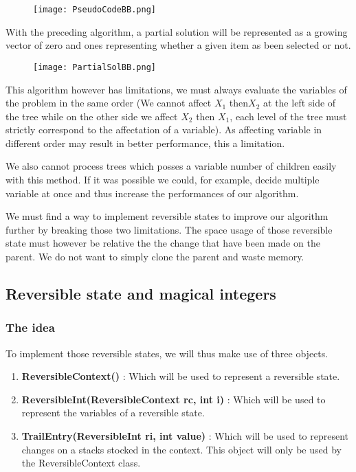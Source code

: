 \begin{figure}[!ht]
    \centering
    \texttt{[image: PseudoCodeBB.png]}
    \label{fig:Knapsack_example}
\end{figure}
\FloatBarrier

With the preceding algorithm, a partial solution will be represented as a growing vector
of zero and ones representing whether a given item as been selected or not.

\begin{figure}[!ht]
    \centering
    \texttt{[image: PartialSolBB.png]}
    \label{fig:Knapsack_example}
\end{figure}
\FloatBarrier

This algorithm however has limitations, we must always evaluate the variables of the 
problem in the same order (We cannot affect $X_1$ then$ X_2$ at the left side of the tree 
while on the other side we affect $X_2$ then $X_1$, each level of the tree must strictly 
correspond to the affectation of a variable). As affecting variable in different order may result in better performance, this a limitation.\newline

We also cannot process trees which posses a variable number of children easily with this method. If it was possible we could, for example, decide multiple variable at once
and thus increase the performances of our algorithm. \newline

We must find a way to implement reversible states to improve our algorithm further
by breaking those two limitations. The space usage of those reversible state must however
be relative the the change that have been made on the parent. We do not want to simply
clone the parent and waste memory.

\subsection{Reversible state and magical integers}

\subsubsection{The idea}

To implement those reversible states, we will thus make use of three objects.

\begin{enumerate}
	\item \textbf{ReversibleContext()} : Which will be used to represent a 
	reversible state.
	\item \textbf{ReversibleInt(ReversibleContext rc, int i)} : Which will be used to 
	represent the variables of a reversible state.
	\item \textbf{TrailEntry(ReversibleInt ri, int value)} : Which will be used
	to represent changes on a stacks stocked in the context. This object will
	only be used by the ReversibleContext class.
\end{enumerate}

